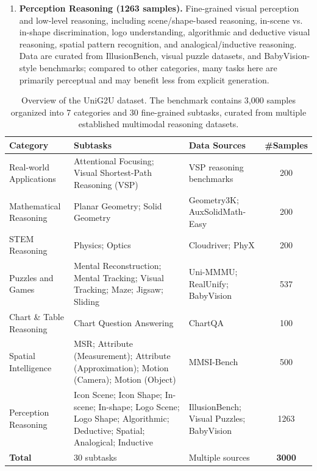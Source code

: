 \documentclass{article}
\theoremstyle{plain}
\theoremstyle{definition}
\theoremstyle{remark}
\begin{document}
\begin{enumerate}
    \item \textbf{Perception Reasoning (1263 samples).} Fine-grained visual perception and low-level reasoning, including scene/shape-based reasoning, in-scene vs. in-shape discrimination, logo understanding, algorithmic and deductive visual reasoning, spatial pattern recognition, and analogical/inductive reasoning. Data are curated from IllusionBench, visual puzzle datasets, and BabyVision-style benchmarks; compared to other categories, many tasks here are primarily perceptual and may benefit less from explicit generation.
\end{enumerate}
\begin{table}[t]
\centering
\small
\caption{Overview of the UniG2U dataset. The benchmark contains 3,000 samples organized into 7 categories and 30 fine-grained subtasks, curated from multiple established multimodal reasoning datasets.}
\label{tab:dataset}
\begin{tabular}{l p{4.2cm} p{4.2cm} c}
\toprule
\textbf{Category} & \textbf{Subtasks} & \textbf{Data Sources} & \textbf{\#Samples} \\
\midrule

Real-world Applications 
& Attentional Focusing; Visual Shortest-Path Reasoning (VSP)
& VSP reasoning benchmarks
& 200 \\

Mathematical Reasoning
& Planar Geometry; Solid Geometry
& Geometry3K; AuxSolidMath-Easy
& 200 \\

STEM Reasoning
& Physics; Optics
& Cloudriver; PhyX
& 200 \\

Puzzles and Games
& Mental Reconstruction; Mental Tracking; Visual Tracking; Maze; Jigsaw; Sliding
& Uni-MMMU; RealUnify; BabyVision
& 537 \\

Chart \& Table Reasoning
& Chart Question Answering
& ChartQA
& 100 \\

Spatial Intelligence
& MSR; Attribute (Measurement); Attribute (Approximation); Motion (Camera); Motion (Object)
& MMSI-Bench
& 500 \\

Perception Reasoning
& Icon Scene; Icon Shape; In-scene; In-shape; Logo Scene; Logo Shape; Algorithmic; Deductive; Spatial; Analogical; Inductive
& IllusionBench; Visual Puzzles; BabyVision
& 1263 \\

\midrule
\textbf{Total} & 30 subtasks & Multiple sources & \textbf{3000} \\
\bottomrule
\end{tabular}
\vspace{2pt}

\end{table}
\end{document}
